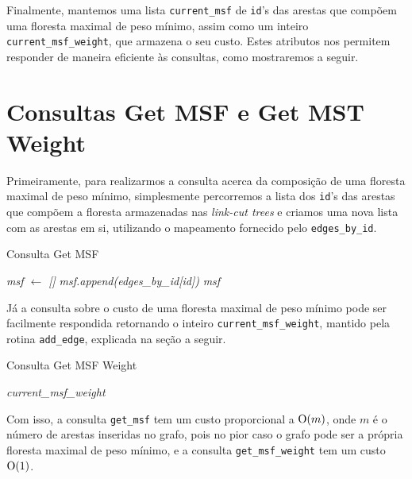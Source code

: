 Finalmente, mantemos uma lista \texttt{current\_msf} de \texttt{id}'s das arestas que compõem uma floresta maximal de peso mínimo, assim como um inteiro \texttt{current\_msf\_weight}, que armazena o seu custo. Estes atributos nos permitem responder de maneira eficiente às consultas, como mostraremos a seguir.

\section{Consultas Get MSF e Get MST Weight}
\label{sec:imsf-get-msf}

Primeiramente, para realizarmos a consulta acerca da composição de uma floresta maximal de peso mínimo, simplesmente percorremos a lista dos \texttt{id}'s das arestas que compõem a floresta armazenadas nas \emph{link-cut trees} e criamos uma nova lista com as arestas em si, utilizando o mapeamento fornecido pelo \texttt{edges\_by\_id}.

\begin{algorithm}[h!]
    \caption{Consulta Get MSF}\label{imsf-get-msf}
    \begin{algorithmic}
        \State \emph{msf $\gets$ []}
        \State \emph{msf.append(edges\_by\_id[id])}
        \EndFor
        \State \Return \emph{msf}
        \EndFunction
    \end{algorithmic}
\end{algorithm}

Já a consulta sobre o custo de uma floresta maximal de peso mínimo pode ser facilmente respondida retornando o inteiro \texttt{current\_msf\_weight}, mantido pela rotina \texttt{add\_edge}, explicada na seção a seguir.

\begin{algorithm}[h!]
    \caption{Consulta Get MSF Weight}\label{imsf-get-msf-weight}
    \begin{algorithmic}
        \State \Return \emph{current\_msf\_weight}
        \EndFunction
    \end{algorithmic}
\end{algorithm}

Com isso, a consulta \texttt{get\_msf} tem um custo proporcional a $\mathrm{O}(m)$, onde $m$ é o número de arestas inseridas no grafo, pois no pior caso o grafo pode ser a própria floresta maximal de peso mínimo, e a consulta \texttt{get\_msf\_weight} tem um custo $\mathrm{O}(1)$.

